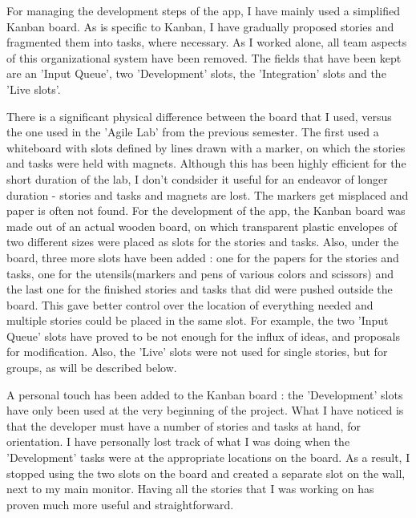 \documentclass{article}
\begin{document}
For managing the development steps of the app, I have mainly used a simplified
Kanban board. As is specific to Kanban, I have gradually proposed stories and
fragmented them into tasks, where necessary. As I worked alone, all team aspects
of this organizational system have been removed. The fields that have been kept
are an 'Input Queue', two 'Development' slots, the 'Integration' slots and the
'Live slots'.\newline

There is a significant physical difference between the board that I used, versus
the one used in the 'Agile Lab' from the previous semester. The first used a
whiteboard with slots defined by lines drawn with a marker, on which the stories
and tasks were held with magnets. Although this has been highly efficient for
the short duration of the lab, I don't condsider it useful for an endeavor of
longer duration - stories and tasks and magnets are lost. The markers get
misplaced and paper is often not found. For the development of the app, the
Kanban board was made out of an actual wooden board, on which transparent
plastic envelopes of two different sizes were placed as slots for the stories
and tasks. Also, under the board, three more slots have been added : one for the
papers for the stories and tasks, one for the utensils(markers and pens of
various colors and scissors) and the last one for the finished stories and tasks
that did were pushed outside the board. This gave better control over
the location of everything needed and multiple stories could be placed
in the same slot. For example, the two 'Input Queue' slots have proved
to be not enough for the influx of ideas, and proposals for modification. Also,
the 'Live' slots were not used for single stories, but for groups, as will be
described below. \newline

A personal touch has been added to the Kanban board : the 'Development' slots
have only been used at the very beginning of the project. What I have noticed is
that the developer must have a number of stories and tasks at hand, for
orientation. I have personally lost track of what I was doing when the
'Development' tasks were at the appropriate locations on the board. As a result,
I stopped using the two slots on the board and created a separate slot on the
wall, next to my main monitor. Having all the stories that I was working on has
proven much more useful and straightforward.\newline
\end{document}
